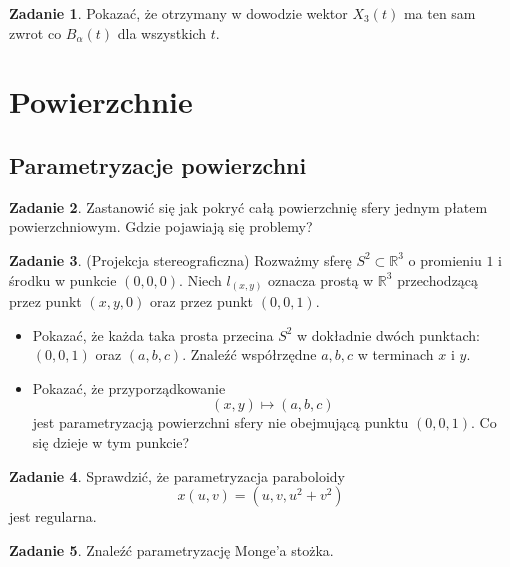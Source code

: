 \documentclass[a4paper,11pt]{article}
\theoremstyle{definition}\newtheorem{exercise}{Zadanie}
\theoremstyle{definition}\newtheorem{remark}{Uwaga}
\begin{document}
\begin{exercise}
Pokazać, że otrzymany w dowodzie wektor $X_3(t)$ ma ten sam zwrot co 
$B_\alpha(t)$ dla wszystkich $t$.
\end{exercise}



\section{Powierzchnie}

\subsection{Parametryzacje powierzchni}
\begin{exercise}
Zastanowić się jak pokryć całą powierzchnię sfery jednym płatem 
powierzchniowym. Gdzie pojawiają się problemy?
\end{exercise}

\begin{exercise}(Projekcja stereograficzna)
 Rozważmy sferę $S^2\subset \mathbb{R}^3$ o promieniu $1$ i środku w punkcie 
$(0,0,0)$. Niech 
$l_{(x,y)}$ oznacza prostą w $\mathbb{R}^3$ przechodzącą przez punkt $(x,y,0)$ 
oraz przez punkt $(0,0,1)$. 
\begin{itemize}
 \item Pokazać, że każda taka prosta przecina $S^2$ w dokładnie dw\'och 
punktach: $(0,0,1)$ oraz $(a,b,c)$. Znaleźć wsp\'ołrzędne $a,b,c$ w terminach 
$x$ i $y$.
\item Pokazać, że przyporządkowanie
\[(x,y)\mapsto (a,b,c)\]
jest parametryzacją powierzchni sfery nie obejmującą punktu $(0,0,1)$. Co się 
dzieje w tym punkcie?
\end{itemize}
\end{exercise}


\begin{exercise}
Sprawdzić, że parametryzacja paraboloidy
\[x(u,v)=(u,v,u^2+v^2)\] jest regularna.
\end{exercise}

\begin{exercise}
Znaleźć parametryzację Monge'a stożka. 
\end{exercise}
\end{document}
